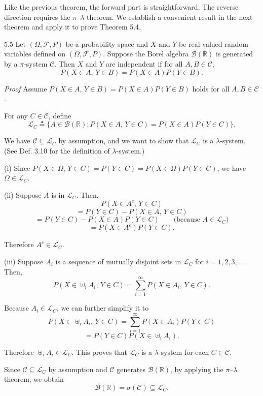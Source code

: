 Like the previous theorem, the forward part is straightforward. The reverse direction requires the $\pi$--$\lambda$ theorem. We establish a convenient result in the next theorem and apply it to prove Theorem 5.4.

\begin{thmbox}{5.5}
Let $(\Omega,\mathcal{F},P)$ be a probability space and $X$ and $Y$ be real-valued random variables defined on $(\Omega,\mathcal{F},P)$. Suppose the Borel algebra $\mathcal{B}(\mathbb{R})$ is generated by a $\pi$-system $\mathcal{C}$. Then $X$ and $Y$ are independent if for all $A,B \in \mathcal{C}$,
\[
P(X \in A,\, Y \in B)=P(X \in A)P(Y \in B).
\]
\end{thmbox}

\textit{Proof} Assume $P(X \in A,\, Y \in B)=P(X \in A)P(Y \in B)$ holds for all $A,B \in \mathcal{C}$.

For any $C \in \mathcal{C}$, define
\[
\mathcal{L}_C \triangleq \{A \in \mathcal{B}(\mathbb{R}) : P(X \in A,\, Y \in C)=P(X \in A)P(Y \in C)\}.
\]

We have $\mathcal{C} \subseteq \mathcal{L}_C$ by assumption, and we want to show that $\mathcal{L}_C$ is a $\lambda$-system. (See Def. 3.10 for the definition of $\lambda$-system.)

(i) Since $P(X \in \Omega,\, Y \in C)=P(Y \in C)=P(X \in \Omega)P(Y \in C)$, we have $\Omega \in \mathcal{L}_C$.

(ii) Suppose $A$ is in $\mathcal{L}_C$. Then,
\[
P(X \in A^c,\, Y \in C)
\]
\[
= P(Y \in C)-P(X \in A,\, Y \in C)
\]
\[
= P(Y \in C)-P(X \in A)P(Y \in C) \qquad \text{(because } A \in \mathcal{L}_C\text{)}
\]
\[
= P(X \in A^c)P(Y \in C).
\]

Therefore $A^c \in \mathcal{L}_C$.

(iii) Suppose $A_i$ is a sequence of mutually disjoint sets in $\mathcal{L}_C$ for $i=1,2,3,\ldots$. Then,
\[
P(X \in \uplus_i A_i,\, Y \in C)=\sum_{i=1}^{\infty} P(X \in A_i,\, Y \in C).
\]

Because $A_i \in \mathcal{L}_C$, we can further simplify it to
\[
P(X \in \uplus_i A_i,\, Y \in C)=\sum_{i=1}^{\infty} P(X \in A_i)P(Y \in C)
\]
\[
= P(Y \in C)P(X \in \uplus_i A_i).
\]

Therefore $\uplus_i A_i \in \mathcal{L}_C$. This proves that $\mathcal{L}_C$ is a $\lambda$-system for each $C \in \mathcal{C}$.

Since $\mathcal{C} \subseteq \mathcal{L}_C$ by assumption and $\mathcal{C}$ generates $\mathcal{B}(\mathbb{R})$, by applying the $\pi$--$\lambda$ theorem, we obtain
\[
\mathcal{B}(\mathbb{R})=\sigma(\mathcal{C}) \subseteq \mathcal{L}_C.
\]

